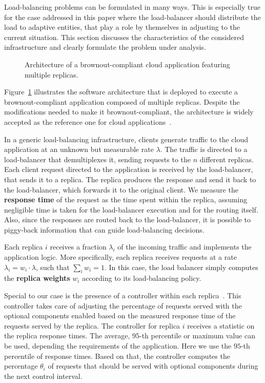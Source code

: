 Load-balancing problems can be formulated in many ways. This is
especially true for the case addressed in this paper where the
load-balancer should distribute the load to adaptive entities, that
play a role by themselves in adjusting to the current situation. This
section discusses the characteristics of the considered infrastructure
and clearly formulate the problem under analysis.

\begin{figure}[t]
  \centering 
   
  \caption{Architecture of a brownout-compliant cloud application
    featuring multiple replicas.}
    \vspace{-6mm}
  \label{fig:architecture}
\end{figure}

Figure~\ref{fig:architecture} illustrates the software architecture
that is deployed to execute a brownout-compliant application composed
of multiple replicas. Despite the modifications needed to make it
brownout-compliant, the architecture is widely accepted as the
reference one for cloud applications~\citep{Barroso09}.

In a generic load-balancing infrastructure, clients generate traffic
to the cloud application at an unknown but measurable rate
$\lambda$. The traffic is directed to a load-balancer that demultiplexes it,
sending requests to the $n$ different replicas. Each client request
directed to the application is received by the load-balancer, that
sends it to a replica. The replica produces the response and send it
back to the load-balancer, which forwards it to the original
client. We measure the \textbf{response time} of the request as the
time spent within the replica, assuming negligible time is taken for
the load-balancer execution and for the routing itself. Also, since
the responses are routed back to the load-balancer, it is possible to
piggy-back information that can guide load-balancing decisions.

Each replica $i$ receives a fraction $\lambda_i$ of the incoming
traffic and implements the application logic. More specifically, each
replica receives requests at a rate $\lambda_i = w_i \cdot \lambda$,
such that $\sum_{i} w_i = 1$. In this case, the load balancer simply
computes the \textbf{replica weights} $w_i$ according to its
load-balancing policy.

Special to our case is the presence of a controller within each
replica~\cite{cloudish-tr}. This controller takes care of adjusting
the percentage of requests served with the optional components enabled
based on the measured response time of the requests served by the
replica. The controller for replica $i$ receives a statistic on the
replica response times. The average, $95$-th percentile or maximum value can be used, 
depending the requirements of the application.
Here we use the $95$-th percentile of
response times. Based on that, the controller computes the percentage 
$\theta_i$ of requests that should be served with optional components 
during the next control interval.


